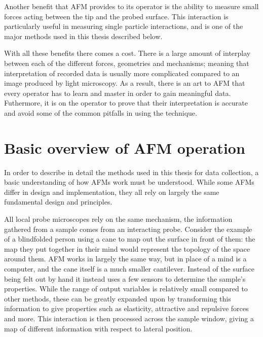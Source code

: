 Another benefit that AFM provides to its operator is the ability to measure small forces acting between the tip and the probed surface. This interaction is particularly useful in measuring single particle interactions, and is one of the major methods used in this thesis described below.


With all these benefits there comes a cost. There is a large amount of interplay between each of the different forces, geometries and mechanisms; meaning that interpretation of recorded data is usually more complicated compared to an image produced by light microscopy. As a result, there is an art to AFM that every operator has to learn and master in order to gain meaningful data. Futhermore, it is on the operator to prove that their interpretation is accurate and avoid some of the common pitfalls in using the technique.

\section{Basic overview of AFM operation}

In order to describe in detail the methods used in this thesis for data collection, a basic understanding of how AFMs work must be understood. While some AFMs differ in design and implementation, they all rely on largely the same fundamental design and principles. 

All local probe microscopes rely on the same mechanism, the information gathered from a sample comes from an interacting probe. Consider the example of a blindfolded person using a cane to map out the surface in front of them: the map they put together in their mind would represent the topology of the space around them. AFM works in largely the same way, but in place of a mind is a computer, and the cane itself is a much smaller cantilever. Instead of the surface being felt out by hand it instead uses a few sensors to determine the sample's properties. While the range of output variables is relatively small compared to other methods, these can be greatly expanded upon by transforming this information to give properties such as elasticity, attractive and repulsive forces and more. This interaction is then processed across the sample window, giving a map of different information with respect to lateral position.

